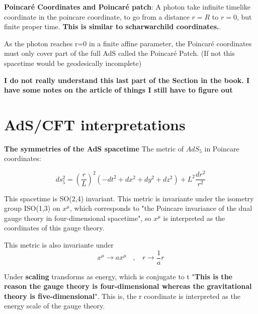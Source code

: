 \documentclass[12pt]{article}
\begin{document}
\textbf{Poincaré Coordinates and Poincaré patch}: A photon take infinite timelike coordinate in the poincare coordinate, to go from a distance \( r=R \) to \( r=0 \), but finite proper time. \textbf{This is similar to scharwarchild coordinates.}.

As the photon reaches r=0 in a finite affine parameter, the Poincaré coordinates must only cover part of the full AdS called the Poincaré Patch. (If not this spacetime would be geodesically incomplete)

\vspace{.5cm}

\textbf{I do not really understand this last part of the Section in the book. I have some notes on the article of things I still have to figure out}

\section{AdS/CFT interpretations}

\textbf{The symmetries of the AdS spacetime} The metric of \( AdS_5 \) in Poincare coordinates:

\begin{equation}
    ds_5^2 = \left(\frac{r}{L}\right)^2(-dt^2 + dx^2 + dy^2 + dz^2) + L^2\frac{dr^2}{r^2}
\end{equation}

This spacetime is SO(2,4) invariant. This metric is invariante under the isometry group ISO(1,3) on \(x^\mu \), which corresponds to "the Poincare invariance of the dual gauge theory in four-dimensional spacetime", so \( x^\mu \) is interpreted as the coordinates of this gauge theory.

\vspace{.5cm}

This metric is also invariante under
\begin{equation}
    x^\mu \longrightarrow ax^\mu ~~~~,~~~~ r \longrightarrow \frac{1}{a}r
\end{equation}

Under \textbf{scaling} transforms as energy, which is conjugate to t "\textbf{This is the reason the gauge theory is four-dimensional whereas the gravitational theory is five-dimensional}". This is, the r coordinate is interpreted as the energy scale of the gauge theory.

\vspace{.5cm}
\end{document}
